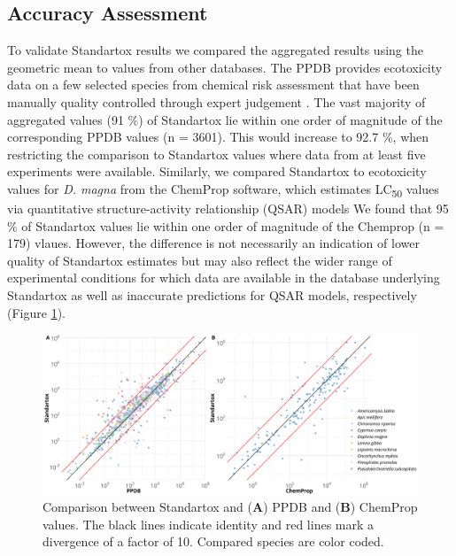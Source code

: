 \documentclass[journal,datadescriptor,accept,moreauthors,pdftex]{Definitions/mdpi}
\begin{document}
\subsection{Accuracy Assessment}
To validate Standartox results we compared the aggregated results using the geometric mean to values from other databases. The PPDB provides ecotoxicity data on a few selected species from chemical risk assessment that have been manually quality controlled through expert judgement \citep{lewis_international_2016}. The vast majority of aggregated values (91 \%) of Standartox lie within one order of magnitude of the corresponding PPDB values (n = 3601). This would increase to 92.7 \%, when restricting the comparison to Standartox values where data from at least five experiments were available. Similarly, we compared Standartox to ecotoxicity values for \textit{D. magna} from the ChemProp \citep{ufzdepartmentofecologicalchemistry_chemprop_2019} software, which estimates LC\textsubscript{50} values via quantitative structure-activity relationship (QSAR) models \citep{schuurmann_quantitative_2011} We found that  95 \% of Standartox values lie within one order of magnitude of the Chemprop (n = 179) vlaues. However, the diﬀerence is not necessarily an indication of lower quality of Standartox estimates but may also reflect the wider range of experimental conditions for which data are available in the database underlying Standartox as well as inaccurate predictions for QSAR models, respectively (Figure \ref{fig:standartox_ppdb_diff}).

\begin{figure}[H]
    \centering
    \includegraphics[width=1\linewidth]{article/figures/gg_ppdb_stan_compare_continous.png}
    \caption{Comparison between Standartox and (\textbf{A}) PPDB and (\textbf{B}) ChemProp values. The black lines indicate identity and red lines mark a divergence of a factor of 10. Compared species are color coded.}
    \label{fig:standartox_ppdb_diff}
\end{figure}
\end{document}
